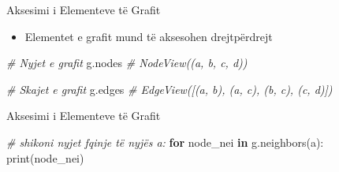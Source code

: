 \documentclass[
  ignorenonframetext,
]{beamer}
\newenvironment{Shaded}{\begin{snugshade}}{\end{snugshade}}
\newcommand{\BuiltInTok}[1]{#1}
\newcommand{\CommentTok}[1]{\textcolor[rgb]{0.56,0.35,0.01}{\textit{#1}}}
\newcommand{\ControlFlowTok}[1]{\textcolor[rgb]{0.13,0.29,0.53}{\textbf{#1}}}
\newcommand{\KeywordTok}[1]{\textcolor[rgb]{0.13,0.29,0.53}{\textbf{#1}}}
\newcommand{\NormalTok}[1]{#1}
\newcommand{\StringTok}[1]{\textcolor[rgb]{0.31,0.60,0.02}{#1}}
\providecommand{\tightlist}{%
  \setlength{\itemsep}{0pt}\setlength{\parskip}{0pt}}
\begin{document}
\begin{frame}[fragile]{Aksesimi i Elementeve të Grafit}
\protect\hypertarget{aksesimi-i-elementeve-tuxeb-grafit}{}
\begin{itemize}
\tightlist
\item
  Elementet e grafit mund të aksesohen drejtpërdrejt
\end{itemize}


\begin{Shaded}
\begin{Highlighting}[]
\CommentTok{\# Nyjet e grafit}
\NormalTok{g.nodes}
\CommentTok{\# NodeView((\textquotesingle{}a\textquotesingle{}, \textquotesingle{}b\textquotesingle{}, \textquotesingle{}c\textquotesingle{}, \textquotesingle{}d\textquotesingle{}))}

\CommentTok{\# Skajet e grafit}
\NormalTok{g.edges}
\CommentTok{\# EdgeView([(\textquotesingle{}a\textquotesingle{}, \textquotesingle{}b\textquotesingle{}), (\textquotesingle{}a\textquotesingle{}, \textquotesingle{}c\textquotesingle{}), (\textquotesingle{}b\textquotesingle{}, \textquotesingle{}c\textquotesingle{}), (\textquotesingle{}c\textquotesingle{}, \textquotesingle{}d\textquotesingle{})])}
\end{Highlighting}
\end{Shaded}
\end{frame}

\begin{frame}[fragile]{Aksesimi i Elementeve të Grafit}
\protect\hypertarget{aksesimi-i-elementeve-tuxeb-grafit-1}{}

\begin{Shaded}
\begin{Highlighting}[]
\CommentTok{\# shikoni nyjet fqinje të nyjës \textquotesingle{}a\textquotesingle{}:}
\ControlFlowTok{for}\NormalTok{ node\_nei }\KeywordTok{in}\NormalTok{ g.neighbors(}\StringTok{\textquotesingle{}a\textquotesingle{}}\NormalTok{):}
    \BuiltInTok{print}\NormalTok{(node\_nei)}
\end{Highlighting}
\end{Shaded}
\end{frame}
\end{document}
